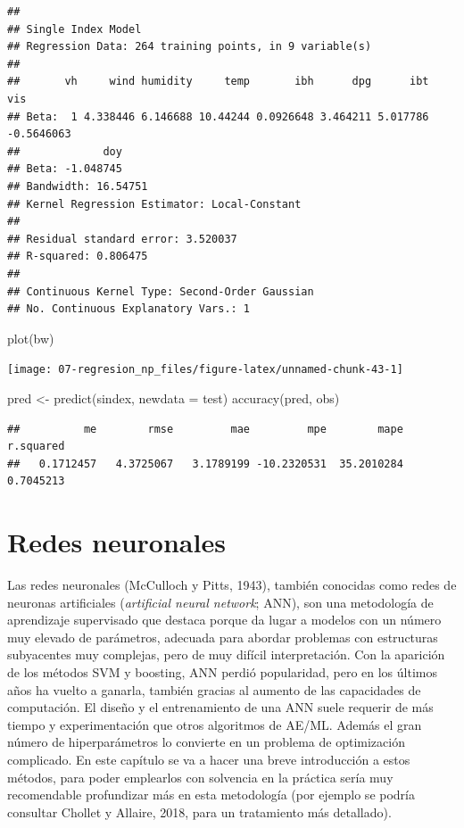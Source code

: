 \documentclass[
]{book}
\newenvironment{Shaded}{\begin{snugshade}}{\end{snugshade}}
\newcommand{\AttributeTok}[1]{\textcolor[rgb]{0.77,0.63,0.00}{#1}}
\newcommand{\FunctionTok}[1]{\textcolor[rgb]{0.00,0.00,0.00}{#1}}
\newcommand{\NormalTok}[1]{#1}
\newcommand{\OtherTok}[1]{\textcolor[rgb]{0.56,0.35,0.01}{#1}}
\theoremstyle{break}
\theoremstyle{definition}
\theoremstyle{definition}
\theoremstyle{definition}
\theoremstyle{definition}
\theoremstyle{remark}
\begin{document}
\begin{verbatim}
## 
## Single Index Model
## Regression Data: 264 training points, in 9 variable(s)
## 
##       vh     wind humidity     temp       ibh      dpg      ibt        vis
## Beta:  1 4.338446 6.146688 10.44244 0.0926648 3.464211 5.017786 -0.5646063
##             doy
## Beta: -1.048745
## Bandwidth: 16.54751
## Kernel Regression Estimator: Local-Constant
## 
## Residual standard error: 3.520037
## R-squared: 0.806475
## 
## Continuous Kernel Type: Second-Order Gaussian
## No. Continuous Explanatory Vars.: 1
\end{verbatim}

\begin{Shaded}
\begin{Highlighting}[]
\FunctionTok{plot}\NormalTok{(bw)}
\end{Highlighting}
\end{Shaded}

\begin{center}\texttt{[image: 07-regresion\_np\_files/figure-latex/unnamed-chunk-43-1]} \end{center}

\begin{Shaded}
\begin{Highlighting}[]
\NormalTok{pred }\OtherTok{\textless{}{-}} \FunctionTok{predict}\NormalTok{(sindex, }\AttributeTok{newdata =}\NormalTok{ test)}
\FunctionTok{accuracy}\NormalTok{(pred, obs)}
\end{Highlighting}
\end{Shaded}

\begin{verbatim}
##          me        rmse         mae         mpe        mape   r.squared 
##   0.1712457   4.3725067   3.1789199 -10.2320531  35.2010284   0.7045213
\end{verbatim}

\hypertarget{neural-nets}{%
\chapter{Redes neuronales}\label{neural-nets}}

Las redes neuronales (McCulloch y Pitts, 1943), también conocidas como redes de neuronas artificiales (\emph{artificial neural network}; ANN), son una metodología de aprendizaje supervisado que destaca porque da lugar a modelos con un número muy elevado de parámetros, adecuada para abordar problemas con estructuras subyacentes muy complejas, pero de muy difícil interpretación.
Con la aparición de los métodos SVM y boosting, ANN perdió popularidad, pero en los últimos años ha vuelto a ganarla, también gracias al aumento de las capacidades de computación.
El diseño y el entrenamiento de una ANN suele requerir de más tiempo y experimentación que otros algoritmos de AE/ML. Además el gran número de hiperparámetros lo convierte en un problema de optimización complicado.
En este capítulo se va a hacer una breve introducción a estos métodos, para poder emplearlos con solvencia en la práctica sería muy recomendable profundizar más en esta metodología (por ejemplo se podría consultar Chollet y Allaire, 2018, para un tratamiento más detallado).
\end{document}
